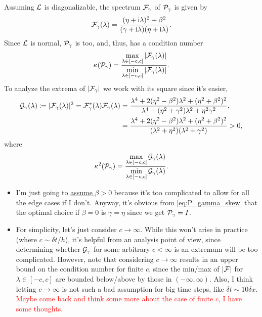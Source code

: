 \documentclass[a4paper,10pt]{article}
\newcommand{\tcr}{\textcolor{red}}
\begin{document}
{Assuming ${\cal L}$ is diagonalizable, the spectrum ${\cal F}_{\gamma}$ of ${\cal P}_{\gamma}$ is given by
\begin{align}
\label{eq:F_skew}
{\cal F}_{\gamma}(\lambda) = \frac{(\eta + \mathrm{i} \lambda)^2 + \beta^2}{(\gamma + \mathrm{i} \lambda) (\eta + \mathrm{i} \lambda)}.
\end{align}
Since ${\cal L}$ is normal, ${\cal P}_{\gamma}$ is too, and, thus, has a condition number
\begin{align*}
\kappa ({\cal P}_{\gamma}) = \frac{\max \limits_{\lambda \in [-c, c]}  |{\cal F}_{\gamma}(\lambda)|}{\min \limits_{\lambda \in [-c, c]}  |{\cal F}_{\gamma}(\lambda)|}.
\end{align*}
To analyze the extrema of $|{\cal F}_{\gamma}|$ we work with its square since it's easier,
\begin{align} 
\label{eq:G_def}
{\cal G}_{\gamma}(\lambda) 
\coloneqq
|{\cal F}_{\gamma}(\lambda)|^2 
=
{\cal F}_{\gamma}^{*}(\lambda) {\cal F}_{\gamma}(\lambda)
&=
\frac{\lambda^4 +  2(\eta^2 - \beta^2) \lambda^2 + (\eta^2 + \beta^2)^2}{\lambda^4 + (\eta^2 + \gamma^2) \lambda^2 + \eta^2 \gamma^2}, \\
&=
\frac{\lambda^4 +  2(\eta^2 - \beta^2) \lambda^2 + (\eta^2 + \beta^2)^2}{(\lambda^2 + \eta^2)(\lambda^2 + \gamma^2)} > 0,
\end{align}
where
\begin{align}
\label{eq:cond_skew_def}
\kappa^2 ({\cal P}_{\gamma}) = \frac{\max \limits_{\lambda \in [-c, c]}  {\cal G}_{\gamma}(\lambda)}{\min \limits_{\lambda \in [-c, c]}  {\cal G}_{\gamma}(\lambda)}.
\end{align}


\begin{itemize}
\setlength\itemsep{1ex}

\item I'm just going to \underline{assume $\beta > 0$} because it's too complicated to allow for all the edge cases if I don't. Anyway, it's obvious from \eqref{eq:P_gamma_skew} that the optimal choice if $\beta = 0$ is $\gamma = \eta$ since we get ${\cal P}_{\gamma} = I$.

\item For simplicity, let's just consider $c \to \infty$. While this won't arise in practice (where $c \sim \delta t / h$), it's helpful from an analysis point of view, since determining whether ${\cal G}_{\gamma}$ for some arbitrary $c < \infty$ is an extremum will be too complicated. However, note that considering $c \to \infty$ results in an upper bound on the condition number for finite $c$, since the min/max of $|{\cal F}|$ for $\lambda \in [-c,c]$ are bounded below/above by those in $(-\infty, \infty)$. Also, I think letting $c \to \infty$ is not such a bad assumption for big time steps, like $\delta t \sim 10 \delta x$. \tcr{Maybe come back and think some more about the case of finite $c$, I have some thoughts.}


\end{itemize}}
\end{document}
